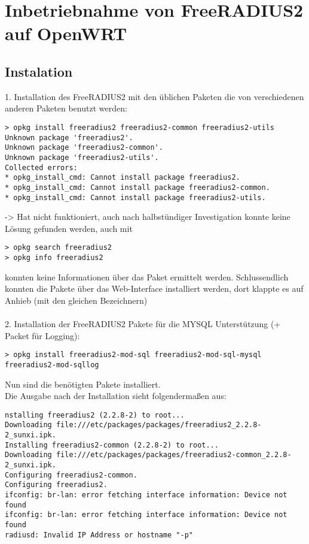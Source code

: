 \section{Inbetriebnahme von FreeRADIUS2 auf OpenWRT}
\subsection{Instalation}
1. Installation des FreeRADIUS2 mit den üblichen Paketen die von verschiedenen anderen Paketen
benutzt werden:
\begin{lstlisting}
> opkg install freeradius2 freeradius2-common freeradius2-utils
Unknown package 'freeradius2'.
Unknown package 'freeradius2-common'.
Unknown package 'freeradius2-utils'.
Collected errors:
* opkg_install_cmd: Cannot install package freeradius2.
* opkg_install_cmd: Cannot install package freeradius2-common.
* opkg_install_cmd: Cannot install package freeradius2-utils.
\end{lstlisting}
-> Hat nicht funktioniert, auch nach halbstündiger Investigation konnte keine Lösung gefunden
werden, auch mit
\begin{lstlisting}
> opkg search freeradius2
> opkg info freeradius2
\end{lstlisting}
konnten keine Informationen über das Paket ermittelt werden. Schlussendlich konnten die Pakete
über das Web-Interface installiert werden, dort klappte es auf Anhieb (mit den gleichen
Bezeichnern)\\
~\\
2. Installation der FreeRADIUS2 Pakete für die MYSQL Unterstützung (+ Packet für Logging):
\begin{lstlisting}
> opkg install freeradius2-mod-sql freeradius2-mod-sql-mysql freeradius2-mod-sqllog
\end{lstlisting}
Nun sind die benötigten Pakete installiert.\\
\newpage
Die Ausgabe nach der Installation sieht folgendermaßen aus:
\begin{lstlisting}
nstalling freeradius2 (2.2.8-2) to root...
Downloading file:///etc/packages/packages/freeradius2_2.2.8-2_sunxi.ipk.
Installing freeradius2-common (2.2.8-2) to root...
Downloading file:///etc/packages/packages/freeradius2-common_2.2.8-2_sunxi.ipk.
Configuring freeradius2-common.
Configuring freeradius2.
ifconfig: br-lan: error fetching interface information: Device not found
ifconfig: br-lan: error fetching interface information: Device not found
radiusd: Invalid IP Address or hostname "-p"
\end{lstlisting}
